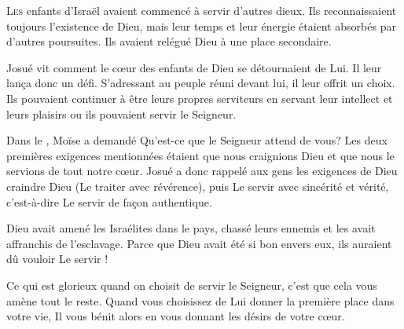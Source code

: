 



\lettrine{L}{es} enfants d'Israël avaient commencé à servir d'autres dieux.
 Ils reconnaissaient toujours l'existence de Dieu, mais leur temps
 et leur énergie étaient absorbés par d'autres poursuites.
 Ils avaient relégué Dieu à une place secondaire.

Josué vit comment le c\oe{}ur des enfants de Dieu se détournaient de Lui.
 Il leur lan\c{c}a donc un défi. S'adressant au peuple réuni devant lui,
 il leur offrit un choix. Ils pouvaient continuer à être
 leurs propres serviteurs
 \ocadr en servant leur intellect et leurs plaisirs \fcadr{}
 ou ils pouvaient servir le Seigneur.


Dans le , Moïse a demandé\frcolon{}
 \Og Qu'est-ce que le Seigneur attend de vous? \Fg{}
 Les deux premières exigences mentionnées
 étaient que nous craignions Dieu et que nous le servions de tout notre c\oe{}ur.
 Josué a donc rappelé aux gens les exigences de Dieu\frcolon{}
 craindre Dieu (Le traiter avec révérence),
 puis Le servir avec sincérité et vérité,
 c'est-à-dire Le servir de fa\c{c}on authentique.

Dieu avait amené les Israélites dans le pays,
 chassé leurs ennemis et les avait affranchis de l'esclavage.
 Parce que Dieu avait été si bon envers eux, ils auraient dû vouloir Le servir !

Ce qui est glorieux quand on choisit de servir le Seigneur,
 c'est que cela vous amène tout le reste.
 Quand vous choisissez de Lui donner la première place dans votre vie,
 Il vous bénit alors en vous donnant les désirs de votre c\oe{}ur. 

\dvrule

